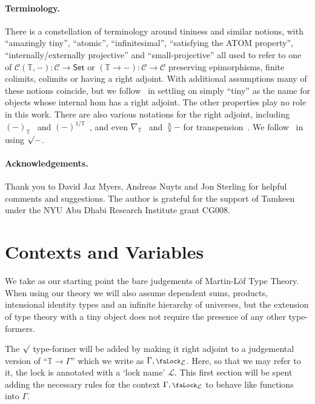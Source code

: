 \documentclass[10pt]{article}
\theoremstyle{definition}
\newcommand{\lock}{\mathchoice {\scalebox{0.8}{\text{\faLock}}}
  {\scalebox{0.8}{\text{\faLock}}} {\scalebox{0.5}{\text{\faLock}}}
  {\scalebox{0.4}{\text{\faLock}}} }
\newcommand{\Tiny}{\mathbb{T}}
\newcommand{\lockn}[1]{\mathcal{#1}}
\newcommand{\ctxlocke}[1]{\lock_{#1}}
\newcommand{\ctxlock}[1]{\ctxlocke{\lockn{#1}}}
\newcommand{\rformsym}{\surd}
\newcommand{\rformu}[1]{\ThisStyle{\raisebox{0.07em}{$\SavedStyle \rformsym$}} #1}
\newcommand{\Set}{\mathsf{Set}}
\newcommand{\C}{\mathcal{C}}
\begin{document}
\paragraph{Terminology.} There is a constellation of terminology
around tininess and similar notions, with ``amazingly tiny'',
``atomic'', ``infinitesimal'', ``satisfying the ATOM property'',
``internally/externally projective'' and ``small-projective'' all used
to refer to one of $\C(\Tiny, -) : \C \to \Set$ or
$(\Tiny \to -) : \C \to \C$ preserving epimorphisms, finite colimits,
colimits or having a right adjoint. With additional assumptions many
of these notions coincide, but we follow~\cite{yetter:tiny} in
settling on simply ``tiny'' as the name for objects whose internal hom
has a right adjoint. The other properties play no role in this work.
There are also various notations for the right adjoint, including
$(-)_\Tiny$~\cite{yetter:tiny} and
$(-)^{1/\Tiny}$~\cite{lawvere:laws-of-motion}, and even
$\nabla_\Tiny$~\cite{yetter:tiny} and ${\between}-$ for
transpension~\cite{transpension}. We follow~\cite{lops} in using
$\rformu -$.

\paragraph{Acknowledgements.}

Thank you to David Jaz Myers, Andreas Nuyts and Jon Sterling for
helpful comments and suggestions. The author is grateful for the
support of Tamkeen under the NYU Abu Dhabi Research Institute grant
CG008.


\section{Contexts and Variables}\label{sec:contexts}

We take as our starting point the bare judgements of Martin-Löf Type
Theory. When using our theory we will also assume dependent sums,
products, intensional identity types and an infinite hierarchy of
universes, but the extension of type theory with a tiny object does
not require the presence of any other type-formers.

The $\rformu$ type-former will be added by making it right adjoint to
a judgemental version of ``$\Tiny \to \Gamma$'' which we write as
$\Gamma, \ctxlock{L}$. Here, so that we may refer to it, the lock is
annotated with a `lock name' $\lockn{L}$. This first section will be
spent adding the necessary rules for the context $\Gamma, \ctxlock{L}$
to behave like functions into $\Gamma$.
\end{document}
